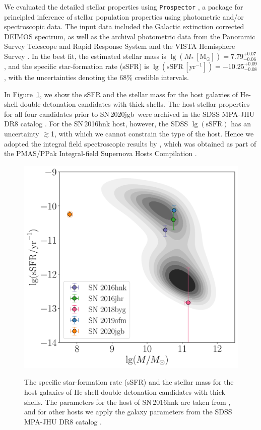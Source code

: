 \documentclass[twocolumn]{aastex631}
\newcommand{\sn}{SN\,2020jgb}
\begin{document}
We evaluated the detailed stellar properties using \texttt{Prospector} \citep{Johnson_prospector_2021}, a package for principled inference of stellar population properties using photometric and/or spectroscopic data. The input data included the Galactic extinction corrected DEIMOS spectrum, as well as the archival photometric data from the Panoramic Survey Telescope and Rapid Response System \citep[Pan-STARRS;][{\it r, i, z} Kron magnitudes]{PS1_2016}  and the VISTA Hemisphere Survey \citep[VHS;][J and $\mathrm{K}_\mathrm{s}$ Petrosian magnitudes]{VHS_2013}. In the best fit, the estimated stellar mass is $\lg (M_*\,[\mathrm{M_\odot}])=7.79_{-0.06}^{+0.07}$, and the specific star-formation rate (sSFR) is $\lg (\mathrm{sSFR}\,[\mathrm{yr}^{-1}])=-10.25_{-0.08}^{+0.09}$, with the uncertainties denoting the 68\% credible intervals. 

In Figure~\ref{fig:host}, we show the sSFR and the stellar mass for the host galaxies of He-shell double detonation candidates with thick shells. The host stellar properties for all four candidates prior to \sn\ were archived in the SDSS MPA-JHU DR8 catalog \citep{Kauffmann_SDSS_2003,Brinchmann_SDSS_2004}. For the SN\,2016hnk host, however, the SDSS $\lg(\mathrm{sSFR})$ has an uncertainty $\gtrsim$1, with which we cannot constrain the type of the host. Hence we adopted the integral field spectroscopic results by \citet{galbany_16hnk_2019}, which was obtained as part of the PMAS/PPak Integral-field Supernova Hosts Compilation \citep[PISCO;][]{Galbany_PISCO_2018}. 
\begin{figure}
    \centering
    \includegraphics[width=\linewidth]{host.pdf}
    \label{fig:host}
    \caption{The specific star-formation rate (sSFR) and the stellar mass for the host galaxies of He-shell double detonation candidates with thick shells. The parameters for the host of SN\,2016hnk are taken from \citet{galbany_16hnk_2019}, and for other hosts we apply the galaxy parameters from the SDSS MPA-JHU DR8 catalog \citep{Kauffmann_SDSS_2003,Brinchmann_SDSS_2004}.}
\end{figure}
\end{document}
